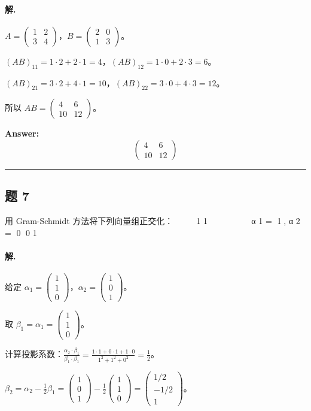 \documentclass[12pt, a4paper]{article}
\newcommand{\problem}[1]{\subsection*{题 #1}}
\newcommand{\solution}{\paragraph{解.}}
\begin{document}
\solution

$A=\begin{pmatrix}1&2\\3&4\end{pmatrix}$，$B=\begin{pmatrix}2&0\\1&3\end{pmatrix}$。

$(AB)_{11}=1\cdot2+2\cdot1=4$，$(AB)_{12}=1\cdot0+2\cdot3=6$。

$(AB)_{21}=3\cdot2+4\cdot1=10$，$(AB)_{22}=3\cdot0+4\cdot3=12$。

所以 $AB=\begin{pmatrix}4&6\\10&12\end{pmatrix}$。

\textbf{Answer:}
\[\boxed{\begin{pmatrix}4&6\\10&12\end{pmatrix}}\]

\vspace{1em}
\hrule
\vspace{1em}

\problem{7}

用 Gram-Schmidt 方法将下列向量组正交化：
   
1 1
   
   
α
1
= 1, α
2
= 0
0 1

\solution

给定 $\alpha_1=\begin{pmatrix}1\\1\\0\end{pmatrix}$，$\alpha_2=\begin{pmatrix}1\\0\\1\end{pmatrix}$。

取 $\beta_1=\alpha_1=\begin{pmatrix}1\\1\\0\end{pmatrix}$。

计算投影系数：$\frac{\alpha_2\cdot\beta_1}{\beta_1\cdot\beta_1}=\frac{1\cdot1+0\cdot1+1\cdot0}{1^2+1^2+0^2}=\frac{1}{2}$。

$\beta_2=\alpha_2-\frac{1}{2}\beta_1=\begin{pmatrix}1\\0\\1\end{pmatrix}-\frac{1}{2}\begin{pmatrix}1\\1\\0\end{pmatrix}=\begin{pmatrix}1/2\\-1/2\\1\end{pmatrix}$。
\end{document}
